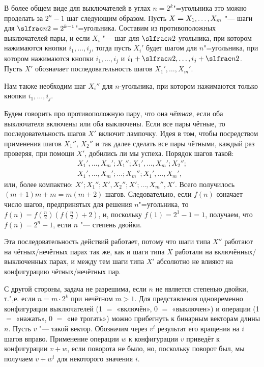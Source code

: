 \documentclass[twoside]{book}
\begin{document}
В более общем виде для выключателей в углах $n=2^k$"=угольника это можно проделать за $2^{n}-1$ шаг следующим образом.
Пусть $X\hm=X_1,\dots,X_m$ "--- шаги для $\slfrac n2=2^{k-1}$"=угольника.
Составим из противоположных выключателей пары, и если $X_i$ "--- шаг для $\slfrac n2$-угольника, при котором нажимаются кнопки $i_1,\dots,i_j$, тогда пусть $X_i'$ будет шагом для $n$"=угольника, при котором нажимаются кнопки $i_1,\dots,i_j$ и $i_1+\slfrac n2,\dots,i_j+\slfrac n2$.
Пусть $X'$ обозначает последовательность шагов $X_1',\dots,X_m'$.

Нам также необходим шаг $X_i''$ для $n$-угольника, при котором нажимаются только кнопки $i_1,\dots,i_j$.

Будем говорить про противоположную пару, что она \emph{чётная}, если оба выключателя включены или оба выключены.
Если все пары чётные, то последовательность шагов $X'$ включит лампочку.
Идея в том, чтобы посредством применения шагов $X_1''$, $X_2''$ и так далее сделать все пары чётными, каждый раз проверяя, при помощи $X'$, добились ли мы успеха.
Порядок шагов такой:
\begin{align*}
X_1',\dots,X_m';X_1'';X_1',\dots,X_m';X_2'';
\\
X_1',\dots,X_m';\dots ; X_m'';X_1',\dots,X_m',
\end{align*}
или, более компактно: $X';X_1'';X',X_2'';X';\dots,X_m'',X'$.
Всего получилось $(m+1)m+m=m(m+2)$ шагов.
Следовательно, если $f(n)$ означает число шагов, предпринятых для решения $n$"=угольника, то 
$f(n)=f(\tfrac n2)(f(\tfrac n2)+2)$,
и, поскольку $f(1)=2^1-1=1$, получаем, что $f(n)=2^n-1$, если $n$ "--- степень двойки. %

Эта последовательность действий работает, потому что шаги типа $X''$ работают на чётных/нечётных парах так же, как и шаги типа $X$ работали на включённых/выключенных парах, и между тем шаги типа $X'$ абсолютно не влияют на конфигурацию чётных/нечётных пар.
\heart

С другой стороны, задача не разрешима, если $n$ не является степенью двойки, т.",е. если $n=m\cdot 2^k$ при нечётном $m>1$.
Для представления одновременно конфигурации выключателей (1 $=$ «включён», 0 $=$ «выключен») и операции (1 $=$ «нажать», 0 $=$ «не трогать») можно прибегнуть к бинарным векторам длины $n$.
Пусть $v$ "--- такой вектор.
Обозначим через $v^i$ результат его вращения на $i$ шагов вправо.
Применение операции $w$ к конфигурации $v$ приведёт к конфигурации $v+w$, если поворота не было, но, поскольку поворот был, мы получаем $v+w^i$ для некоторого значения $i$.
\end{document}
